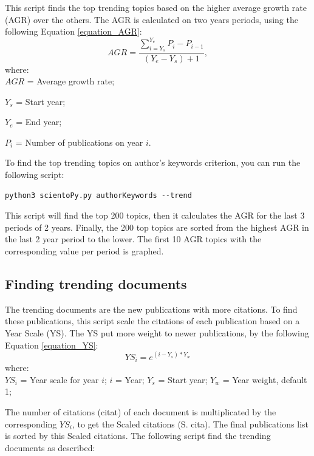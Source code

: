 \documentclass[10pt,letterpaper]{article}
\begin{document}
This script finds the top trending topics based on the higher average growth rate (AGR) over the others. The AGR is calculated on two years periods, using the following Equation \eqref{equation_AGR}:
\begin{equation}
AGR = \frac{\sum\limits_{i = Y_s}^{Y_e}P_i - P_{i-1}}{(Y_e - Y_s)+1},  
\label{equation_AGR}
\end{equation}
where:\\
$AGR$ = Average growth rate;
	
	$Y_s$ = Start year;
	
	$Y_e$ = End year;
	
	$P_i$ = Number of publications on year $i.$
\newline


To find the top trending topics on author's keywords criterion, you can run the following script: 

\begin{verbatim}
python3 scientoPy.py authorKeywords --trend
\end{verbatim}

This script will find the top 200 topics, then it calculates the AGR for the last 3 periods of 2 years. Finally, the 200 top topics are sorted from the highest AGR in the last 2 year period to the lower. The first 10 AGR topics with the corresponding value per period is graphed. 

\subsection{Finding trending documents}

The trending documents are the new publications with more citations. To find these publications, this script scale the citations of each publication based on a Year Scale (YS). The YS put more weight to newer publications, by the following Equation \eqref{equation_YS}:
\begin{equation}
YS_i = e^{(i - Y_s)*Y_w}
\label{equation_YS}
\end{equation}
where:\\
$YS_i$ = Year scale for year $i$;
$i$ = Year;
$Y_s$ = Start year;
$Y_w$ = Year weight, default 1;
\newline

The number of citations (citat) of each document is multiplicated by the corresponding $YS_i$, to get the Scaled citations (S. cita). The final publications list is sorted by this Scaled citations. The following script find the trending documents as described:
\end{document}
